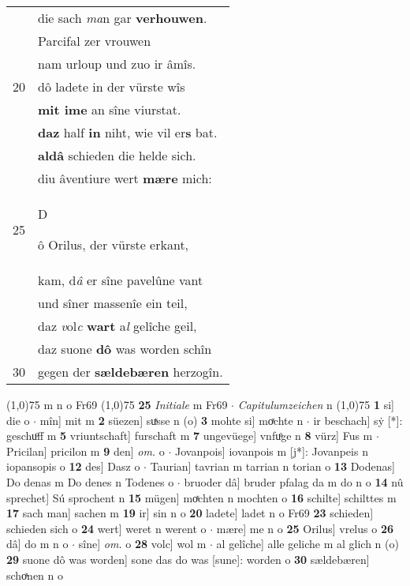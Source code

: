 \documentclass[8pt,a4paper,notitlepage]{article}
\begin{document}
\begin{table}[ht]
\begin{minipage}[t]{0.5\linewidth}
\begin{tabular}{rl}
 & die sach \textit{ma}n gar \textbf{verhouwen}.\\ 
 & Parcifal zer vrouwen\\ 
 & nam urloup und zuo ir âmîs.\\ 
20 & dô ladete in der vürste wîs\\ 
 & \textbf{mit ime} an sîne viurstat.\\ 
 & \textbf{daz} half \textbf{in} niht, wie vil er\textbf{s} bat.\\ 
 & \textbf{aldâ} schieden die helde sich.\\ 
 & diu âventiure wert \textbf{mære} mich:\\ 
25 & \begin{large}D\end{large}ô Orilus, der vürste erkant,\\ 
 & kam, d\textit{â} er sîne pavelûne vant\\ 
 & und sîner massenîe ein teil,\\ 
 & daz \textit{v}ol\textit{c} \textbf{wart} a\textit{l} gelîche geil,\\ 
 & daz suone \textbf{dô} was worden schîn\\ 
30 & gegen der \textbf{sældebæren} herzogîn.\\ 
\end{tabular}
\scriptsize
\line(1,0){75} \newline
m n o Fr69 \newline
\line(1,0){75} \newline
\textbf{25} \textit{Initiale} m Fr69   $\cdot$ \textit{Capitulumzeichen} n  \newline
\line(1,0){75} \newline
\textbf{1} si] die o  $\cdot$ mîn] mit m \textbf{2} süezen] suͯsse n (o) \textbf{3} mohte si] moͯchte n  $\cdot$ ir beschach] sẏ [*]: geschuͦff m \textbf{5} vriuntschaft] furschaft m \textbf{7} ungevüege] vnfuͦge n \textbf{8} vürz] Fus m  $\cdot$ Pricilan] pricilon m \textbf{9} den] \textit{om.} o  $\cdot$ Jovanpois] iovanpois m [j*]: Jovanpeis n iopansopis o \textbf{12} des] Dasz o  $\cdot$ Taurian] tavrian m tarrian n torian o \textbf{13} Dodenas] Do denas m Do denes n Todenes o  $\cdot$ bruoder dâ] bruder pfalag da m do n o \textbf{14} nû sprechet] Sú sprochent n \textbf{15} mügen] moͯchten n mochten o \textbf{16} schilte] schilttes m \textbf{17} sach man] sachen m \textbf{19} ir] sin n o \textbf{20} ladete] ladet n o Fr69 \textbf{23} schieden] schieden sich o \textbf{24} wert] weret n werent o  $\cdot$ mære] me n o \textbf{25} Orilus] vrelus o \textbf{26} dâ] do m n o  $\cdot$ sîne] \textit{om.} o \textbf{28} volc] wol m  $\cdot$ al gelîche] alle geliche m al glich n (o) \textbf{29} suone dô was worden] sone das do was [sune]: worden o \textbf{30} sældebæren] schoͯnen n o \newline
\end{minipage}
\end{table}
\end{document}
